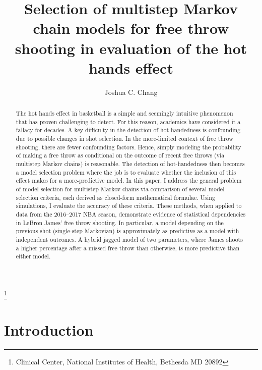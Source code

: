 \documentclass{IOS-Book-Article}
\begin{document}
\pagestyle{headings}
\def\thepage{}

\begin{frontmatter}              %
\author{Joshua C. Chang}
\thanks{Clinical Center, National Institutes of Health, Bethesda MD 20892}
  

\title{Selection of multistep Markov chain models for free throw shooting in evaluation of the hot hands effect}
       

\begin{abstract}

The hot hands effect in basketball is a simple and seemingly intuitive phenomenon that has proven challenging to detect. For this reason,
academics have considered it a fallacy for decades. A key  difficulty in the detection of hot handedness is 
confounding due to possible changes in shot selection. In the more-limited context of free throw shooting, there are fewer confounding factors. 
Hence, simply modeling the probability of making a free throw as conditional on the outcome of recent free throws (via multistep Markov chains) is reasonable. The detection of hot-handedness then becomes a model selection problem where the job is to evaluate whether the inclusion of this effect makes for a more-predictive model. In this paper, I address the general problem of model selection for multistep Markov chains via comparison of several model selection criteria, each derived as closed-form mathematical formulae.  Using simulations, I evaluate the accuracy of these criteria. These methods, when applied to data from the 2016--2017 NBA season, demonstrate evidence of statistical dependencies in LeBron James' free throw shooting. In particular, a model depending on the previous shot (single-step Markovian) is approximately as predictive as a model with independent outcomes. A hybrid jagged model of two parameters, where James shoots a higher percentage after a missed free throw than otherwise, is more predictive than either model.


\end{abstract}

\end{frontmatter}


\section{Introduction}
\end{document}
